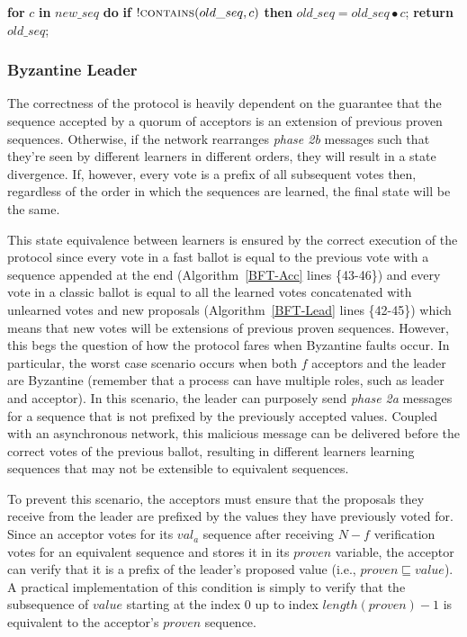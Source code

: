 \begin{algorithm}
\begin{algorithmic}[1]
		\State		
		\State \textbf{for} $c$ \textbf{in} $new\_seq$ \textbf{do} 
		\State \hspace{\algorithmicindent} \textbf{if} $!\Call{contains}{old\_seq,c}$ \textbf{then}
		\State \hspace{\algorithmicindent}\hspace{\algorithmicindent}\hspace{\algorithmicindent} $old\_seq =  old\_seq \bullet c$;
		\State \textbf{return} $old\_seq$;
		\EndFunction
	\end{algorithmic}
\end{algorithm}

\subsubsection{Byzantine Leader}
The correctness of the protocol is heavily dependent on the guarantee that the sequence accepted by a quorum of acceptors is an extension of previous 
proven sequences. Otherwise, if the network rearranges \textit{phase 2b} messages such that they're seen by different learners in different orders, they will result in a state divergence. If, however, every vote is a prefix of all subsequent votes then, regardless of the order in which the sequences are learned, the final state will be the same. \par 
This state equivalence between learners is ensured by the correct execution of the protocol since every vote in a fast ballot is equal to the previous vote with a sequence appended at the end (Algorithm~\ref{BFT-Acc} lines \{43-46\}) and every vote in a classic ballot is equal to all the learned votes concatenated with unlearned votes and new proposals (Algorithm~\ref{BFT-Lead} lines \{42-45\}) which means that new votes will be extensions of previous proven sequences. However, this begs the question of how the protocol fares when Byzantine faults occur. In particular, the worst case scenario occurs when both $f$ acceptors and the leader are Byzantine (remember that a process can have multiple roles, such as leader and acceptor). In this scenario, the leader can purposely send \textit{phase 2a} messages for a sequence that is not prefixed by the previously accepted values. Coupled with an asynchronous network, this malicious message can be delivered before the correct votes of the previous ballot, resulting in different learners learning sequences that may not be extensible to equivalent sequences. \par
To prevent this scenario, the acceptors must ensure that the proposals they receive from the leader are prefixed by the values they have previously voted for. Since an acceptor votes for its $val_a$ sequence after receiving $N-f$ verification votes for an equivalent sequence and stores it in its $proven$ variable, the acceptor can verify that it is a prefix of the leader's proposed value (i.e., $proven \sqsubseteq value$). A practical implementation of this condition is simply to verify that the  subsequence of $value$ starting at the index $0$ up to index $length(proven)-1$ is equivalent to the acceptor's $proven$ sequence. 


